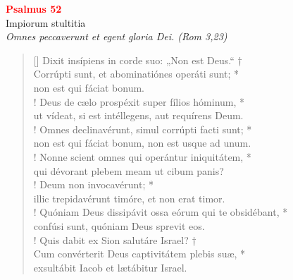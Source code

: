 


\def\greinitialformat#1{%
{\fontsize{39}{39}\selectfont #1}%
}




\vspace{0.3cm}
\begin{center}
 \textcolor{red}{\large \bf Psalmus 52}\\
Impiorum stultitia\\
\textit{\small Omnes peccaverunt et egent gloria Dei. (Rom 3,23)}
\end{center}
\begin{verse}[\versewidth]
Dixit insípiens in corde suo: „Non est Deus.“ †\\
Corrúpti sunt, et abominatiónes operáti sunt; *\\
non est qui fáciat bonum.\\!
\vin Deus de cælo prospéxit super fílios hóminum, *\\
\vin ut vídeat, si est intéllegens, aut requírens Deum.\\!
Omnes declinavérunt, simul corrúpti facti sunt; *\\
non est qui fáciat bonum, non est usque ad unum.\\!
\vin Nonne scient omnes qui operántur iniquitátem, *\\
\vin qui dévorant plebem meam ut cibum panis?\\!
Deum non invocavérunt; *\\
illic trepidavérunt timóre, et non erat timor.\\!
\vin Quóniam Deus dissipávit ossa eórum qui te obsidébant, *\\
\vin confúsi sunt, quóniam Deus sprevit eos.\\!
Quis dabit ex Sion salutáre Israel? †\\
Cum convérterit Deus captivitátem plebis suæ, *\\
exsultábit Iacob et lætábitur Israel.\\
\end{verse}
\vspace{1cm}



